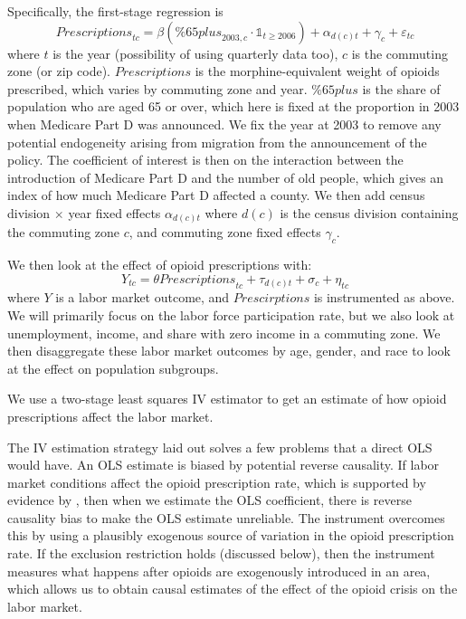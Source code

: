 \documentclass[12pt]{article}
\begin{document}
Specifically, the first-stage regression is
\[ \mathit{Prescriptions}_{tc} = \beta(\mathit{\%65plus}_{2003,c}\cdot\mathds{1}_{t\geq2006}) + \alpha_{d(c)t} + \gamma_c + \varepsilon_{tc} \]
where $t$ is the year (possibility of using quarterly data too), $c$ is the commuting zone (or zip code).  $\mathit{Prescriptions}$ is the morphine-equivalent weight of opioids prescribed, which varies by commuting zone and year.  $\mathit{\%65plus}$ is the share of population who are aged 65 or over, which here is fixed at the proportion in 2003 when Medicare Part D was announced.  We fix the year at 2003 to remove any potential endogeneity arising from migration from the announcement of the policy.  The coefficient of interest is then on the interaction between the introduction of Medicare Part D and the number of old people, which gives an index of how much Medicare Part D affected a county.  We then add census division $\times$ year fixed effects $\alpha_{d(c)t}$ where $d(c)$ is the census division containing the commuting zone $c$, and commuting zone fixed effects $\gamma_c$.

We then look at the effect of opioid prescriptions with:
\[ Y_{tc} = \theta\mathit{Prescriptions}_{tc} + \tau_{d(c)t}+ \sigma_c + \eta_{tc} \]
where $Y$ is a labor market outcome, and $\mathit{Prescirptions}$ is instrumented as above.  We will primarily focus on the labor force participation rate, but we also look at unemployment, income, and share with zero income in a commuting zone.  We then disaggregate these labor market outcomes by age, gender, and race to look at the effect on population subgroups.

We use a two-stage least squares IV estimator to get an estimate of how opioid prescriptions affect the labor market.

The IV estimation strategy laid out solves a few problems that a direct OLS would have.  An OLS estimate is biased by potential reverse causality.  If labor market conditions affect the opioid prescription rate, which is supported by evidence by \textcite{hollingsworth17}, then when we estimate the OLS coefficient, there is reverse causality bias to make the OLS estimate unreliable.  The instrument overcomes this by using a plausibly exogenous source of variation in the opioid prescription rate.  If the exclusion restriction holds (discussed below), then the instrument measures what happens after opioids are exogenously introduced in an area, which allows us to obtain causal estimates of the effect of the opioid crisis on the labor market.
\end{document}
